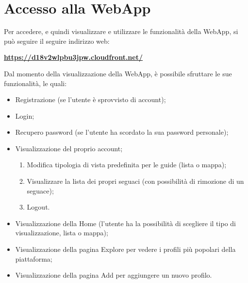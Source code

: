 \section{Accesso alla WebApp} {
    Per accedere, e quindi visualizzare e utilizzare le funzionalità della WebApp, si può seguire il seguire indirizzo web:
    
    \begin{center}
        \textbf{\url{https://d18v2wlpbu3jpw.cloudfront.net/}}
    \end{center}



    Dal momento della visualizzazione della WebApp, è possibile sfruttare le sue funzionalità, le quali:
    \begin{itemize}
        \item Registrazione (se l'utente è sprovvisto di account);
        \item Login;
        \item Recupero password (se l'utente ha scordato la sua password personale);
        \item Visualizzazione del proprio account;
        \begin{enumerate}
            \item Modifica tipologia di vista predefinita per le guide (lista o mappa);
            \item Visualizzare la lista dei propri seguaci (con possibilità di rimozione di un seguace);
            \item Logout.
        \end{enumerate}
        \item Visualizzazione della Home (l'utente ha la possibilità di scegliere il tipo di visualizzazione, lista o mappa);
        \item Visualizzazione della pagina Explore per vedere i profili più popolari della piattaforma;
        \item Visualizzazione della pagina Add per aggiungere un nuovo profilo.
  
    \end{itemize}

}
